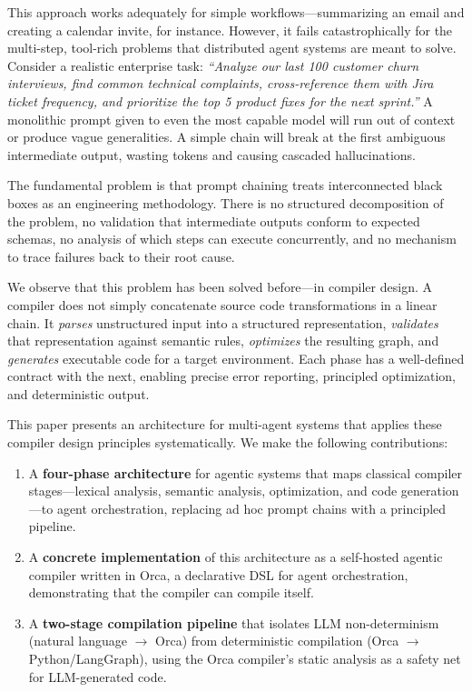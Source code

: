 \documentclass[sigconf,nonacm]{acmart}
\begin{document}
This approach works adequately for simple workflows---summarizing an
email and creating a calendar invite, for instance. However, it fails
catastrophically for the multi-step, tool-rich problems that distributed
agent systems are meant to solve. Consider a realistic enterprise task:
\emph{``Analyze our last 100 customer churn interviews, find common
technical complaints, cross-reference them with Jira ticket frequency,
and prioritize the top 5 product fixes for the next sprint.''} A
monolithic prompt given to even the most capable model will run out of
context or produce vague generalities. A simple chain will break at the
first ambiguous intermediate output, wasting tokens and causing cascaded
hallucinations.

The fundamental problem is that prompt chaining treats interconnected
black boxes as an engineering methodology. There is no structured
decomposition of the problem, no validation that intermediate outputs
conform to expected schemas, no analysis of which steps can execute
concurrently, and no mechanism to trace failures back to their root
cause.

We observe that this problem has been solved before---in compiler
design. A compiler does not simply concatenate source code
transformations in a linear chain. It \emph{parses} unstructured input
into a structured representation, \emph{validates} that representation
against semantic rules, \emph{optimizes} the resulting graph, and
\emph{generates} executable code for a target environment. Each phase
has a well-defined contract with the next, enabling precise error
reporting, principled optimization, and deterministic output.

This paper presents an architecture for multi-agent systems that applies
these compiler design principles systematically. We make the following
contributions:

\begin{enumerate}[leftmargin=*]
  \item A \textbf{four-phase architecture} for agentic systems that maps
        classical compiler stages---lexical analysis, semantic analysis,
        optimization, and code generation---to agent orchestration,
        replacing ad hoc prompt chains with a principled pipeline.
  \item A \textbf{concrete implementation} of this architecture as a
        self-hosted agentic compiler written in Orca, a declarative DSL
        for agent orchestration, demonstrating that the compiler can
        compile itself.
  \item A \textbf{two-stage compilation pipeline} that isolates LLM
        non-determinism (natural language $\rightarrow$ Orca) from
        deterministic compilation (Orca $\rightarrow$ Python/LangGraph),
        using the Orca compiler's static analysis as a safety net for
        LLM-generated code.
\end{enumerate}
\end{document}
